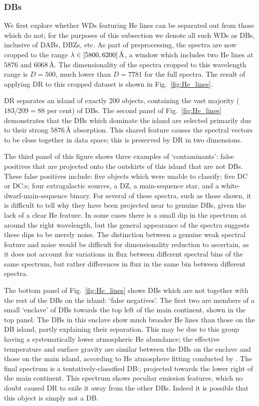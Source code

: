 \documentclass[fleqn,usenatbib]{mnras}
\begin{document}
\subsubsection{DBs}
\label{sec:DBs}

We first explore whether WDs featuring He lines can be separated out from those which do not; for the purposes of this subsection we denote all such WDs as DBs, inclusive of DABs, DBZs, etc.
As part of preprocessing, the spectra are now cropped to the range $\lambda \in \qty[5800, 6200]\,\text{\AA}$, a window which includes two He lines at $5876$ and $6068\,\text{\AA}$.
The dimensionality of the spectra cropped to this wavelength range is $D=500$, much lower than $D=7781$ for the full spectra.
The result of applying DR to this cropped dataset is shown in Fig.~\ref{fig:He_lines}.

DR separates an island of exactly 200 objects, containing the vast majority ($183/209=88$ per cent) of DBs.
The second panel of Fig.~\ref{fig:He_lines} demonstrates that the DBs which dominate the island are selected primarily due to their strong $5876\,\text{\AA}$ absorption.
This shared feature causes the spectral vectors to be close together in data space; this is preserved by DR in two dimensions.

The third panel of this figure shows three examples of `contaminants': false positives that are projected onto the outskirts of this island that are not DBs.
These false positives include: five objects which \citet{manser24} were unable to classify; five DC or DC:s; four extragalactic sources, a DZ, a main-sequence star, and a white-dwarf-main-sequence binary.
For several of these spectra, such as those shown, it is difficult to tell why they have been projected near to genuine DBs, given the lack of a clear He feature.
In some cases there is a small dip in the spectrum at around the right wavelength, but the general appearance of the spectra suggests these dips to be merely noise.
The distinction between a genuine weak spectral feature and noise would be difficult for dimensionality reduction to ascertain, as it does not account for variations in flux between different spectral bins of the same spectrum, but rather differences in flux in the same bin between different spectra.

The bottom panel of Fig.~\ref{fig:He_lines} shows DBs which are not together with the rest of the DBs on the island: `false negatives'.
The first two are members of a small `enclave' of DBs towards the top left of the main continent, shown in the top panel.
The DBs in this enclave show much broader He lines than those on the DB island, partly explaining their separation.
This may be due to this group having a systematically lower atmospheric He abundance; the effective temperature and surface gravity are similar between the DBs on the enclave and those on the main island, according to He atmosphere fitting conducted by \citet{gentilefusillo19}.
The final spectrum is a tentatively-classified DB:, projected towards the lower right of the main continent.
This spectrum shows peculiar emission features, which no doubt caused DR to exile it away from the other DBs.
Indeed it is possible that this object is simply not a DB.
\end{document}
